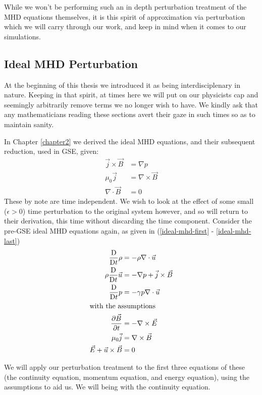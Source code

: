 While we won't be performing such an in depth perturbation treatment of the MHD equations themselves, it is this spirit 
of approximation via perturbation which we will carry through our work, and keep in mind when it comes to our simulations.

\subsection{Ideal MHD Perturbation}

At the beginning of this thesis we introduced it as being interdisciplenary in nature. 
Keeping in that spirit, at times here we will put on our physicists cap and 
seemingly arbitrarily remove terms we no longer wish to have. We 
kindly ask that any mathematicians reading these sections avert their gaze in such 
times so as to maintain sanity.

In Chapter \ref{chapter2} we derived the ideal MHD equations, and their subsequent reduction, used in GSE, given:
\begin{align}
    \vec{j} \times \vec{B} &= \nabla p \\
    \mu_0 \vec{j} &= \nabla \times \vec{B} \\
    \nabla \cdot \vec{B} &= 0
\end{align}
These by note are time independent. We wish to look at the 
effect of some small ($\epsilon > 0$) time perturbation to the original system however, and so 
will return to their derivation, this time without discarding the time component. Consider the pre-GSE ideal MHD equations again, 
as given in (\eqref{ideal-mhd-first} - \eqref{ideal-mhd-last})
\begin{align*}
    \frac{\text{D}}{\text{D} t} \rho &= -\rho \nabla \cdot \vec{u} \\
    \rho \frac{\text{D}}{\text{D} t} \vec{u} &= -\nabla p + \vec{j} \times \vec{B}\\
    \frac{\text{D}}{\text{D} t} p  &= -\gamma p \nabla \cdot \vec{u} \\
    \shortintertext{with the assumptions}
    \pdv{\vec{B}}{t} &= -\nabla \times \vec{E} \\
    \mu_0 \vec{j} &= \nabla \times \vec{B} \\
    \vec{E} + \vec{u} \times \vec{B} &= 0 
\end{align*}

We will apply our perturbation treatment to the first three equations of these (the continuity equation, momentum equation, and 
energy equation), using the assumptions to aid us. We will being with the continuity equation.

